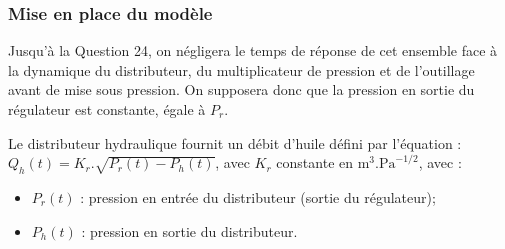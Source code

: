 \documentclass[10pt,fleqn]{article} %
\begin{document}
\subsubsection{Mise en place du modèle}

Jusqu’à la Question 24, on négligera le temps de réponse de cet ensemble face à la dynamique du distributeur, du multiplicateur de pression et de l’outillage avant de mise sous pression. On supposera donc que la pression en sortie du régulateur est constante, égale à $P_r$.

Le distributeur hydraulique fournit un débit d’huile défini par l’équation : 
	$Q_h (t)=K_r.\sqrt{P_r (t)-P_h (t)}$, avec $K_r$ constante en $\text{m}^3.\text{Pa}^{-1/2}$, avec :
\begin{itemize}
\item $P_r(t)$ : pression en entrée du distributeur (sortie du régulateur);
\item $P_h(t)$ : pression en sortie du distributeur.
\end{itemize}
\end{document}
